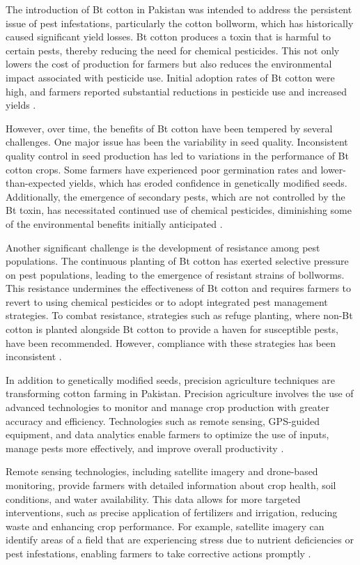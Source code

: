 \documentclass[12pt]{article}
\begin{document}
The introduction of Bt cotton in Pakistan was intended to address the persistent issue of pest infestations, particularly the cotton bollworm, which has historically caused significant yield losses. Bt cotton produces a toxin that is harmful to certain pests, thereby reducing the need for chemical pesticides. This not only lowers the cost of production for farmers but also reduces the environmental impact associated with pesticide use. Initial adoption rates of Bt cotton were high, and farmers reported substantial reductions in pesticide use and increased yields \cite{usda2023}.

However, over time, the benefits of Bt cotton have been tempered by several challenges. One major issue has been the variability in seed quality. Inconsistent quality control in seed production has led to variations in the performance of Bt cotton crops. Some farmers have experienced poor germination rates and lower-than-expected yields, which has eroded confidence in genetically modified seeds. Additionally, the emergence of secondary pests, which are not controlled by the Bt toxin, has necessitated continued use of chemical pesticides, diminishing some of the environmental benefits initially anticipated \cite{usda2022, usda2021}.

Another significant challenge is the development of resistance among pest populations. The continuous planting of Bt cotton has exerted selective pressure on pest populations, leading to the emergence of resistant strains of bollworms. This resistance undermines the effectiveness of Bt cotton and requires farmers to revert to using chemical pesticides or to adopt integrated pest management strategies. To combat resistance, strategies such as refuge planting, where non-Bt cotton is planted alongside Bt cotton to provide a haven for susceptible pests, have been recommended. However, compliance with these strategies has been inconsistent \cite{oec2023}.

In addition to genetically modified seeds, precision agriculture techniques are transforming cotton farming in Pakistan. Precision agriculture involves the use of advanced technologies to monitor and manage crop production with greater accuracy and efficiency. Technologies such as remote sensing, GPS-guided equipment, and data analytics enable farmers to optimize the use of inputs, manage pests more effectively, and improve overall productivity \cite{ahmad2021}.

Remote sensing technologies, including satellite imagery and drone-based monitoring, provide farmers with detailed information about crop health, soil conditions, and water availability. This data allows for more targeted interventions, such as precise application of fertilizers and irrigation, reducing waste and enhancing crop performance. For example, satellite imagery can identify areas of a field that are experiencing stress due to nutrient deficiencies or pest infestations, enabling farmers to take corrective actions promptly \cite{jones2020}.
\end{document}
